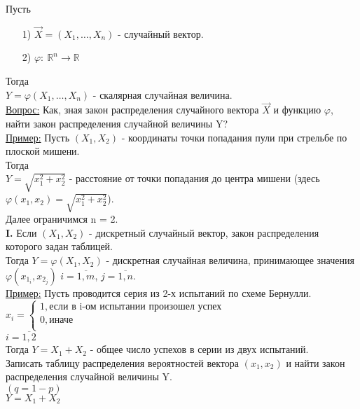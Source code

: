 
Пусть 
\begin{enumerate}
	\item[1)] $\vec{X} = (X_1, \ldots, X_n)$ - случайный вектор.
	\item[2)] $\varphi: \ \mathbb{R}^n \to \mathbb{R}$
\end{enumerate}
Тогда \\
$Y = \varphi(X_1, \ldots, X_n)$ - скалярная случайная величина. \\

\underline{Вопрос:} Как, зная закон распределения случайного вектора $\vec{X}$ и функцию $\varphi$, найти закон распределения случайной величины Y? \\

\underline{Пример:} Пусть $(X_1, X_2)$ - координаты точки попадания пули при стрельбе по плоской мишени. \\
Тогда \\
$Y = \sqrt{x^2_1 + x^2_2}$ - расстояние от точки попадания до центра мишени (здесь $\varphi(x_1, x_2) = \sqrt{x^2_1 + x^2_2}$). \\

Далее ограничимся n = 2. \\

\textbf{I.} Если $(X_1, X_2)$ - дискретный случайный вектор, закон распределения которого задан таблицей.\\
Тогда $Y = \varphi(X_1, X_2)$ - дискретная случайная величина, принимающее значения $\varphi(x_{1_i}, x_{2_j})$ $i = \overline{1,m}$, $j = \overline{1, n}$. \\


\underline{Пример:} Пусть проводится серия из 2-х испытаний по схеме Бернулли. \\
$x_i = 
\begin{cases}
	1, \text{если в i-ом испытании произошел успех} \\
	0, \text{иначе} \\
\end{cases}$ \\
$i = \overline{1,2}$ \\
Тогда $Y = X_1 + X_2$ - общее число успехов в серии из двух испытаний. \\
Записать таблицу распределения вероятностей вектора $(x_1, x_2)$ и найти закон распределения случайной величины Y. \\
$(q = 1 - p)$ \\
$Y = X_1 + X_2$ \\


